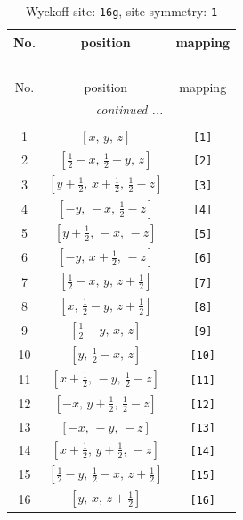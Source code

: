 \documentclass[fleqn,8pt]{jsarticle}
\begin{document}
\begin{longtable}{ccc}
\caption{Wyckoff site: {\tt 16g}, site symmetry: {\tt 1}}
 \\
 \hline \hline
No. & position & mapping \\ \hline \endfirsthead

\multicolumn{2}{l}{\tablename\ \thetable{}} \\
 \hline \hline
No. & position & mapping \\ \hline \endhead

 \hline \hline
\multicolumn{2}{r}{\footnotesize\it continued ...} \\ \endfoot

 \hline \hline
\multicolumn{2}{r}{} \\ \endlastfoot

1 & $\left[ x,\, y,\, z \right]$ & {\tt [1]} \\ \hline
2 & $\left[ \frac{1}{2} - x,\, \frac{1}{2} - y,\, z \right]$ & {\tt [2]} \\ \hline
3 & $\left[ y + \frac{1}{2},\, x + \frac{1}{2},\, \frac{1}{2} - z \right]$ & {\tt [3]} \\ \hline
4 & $\left[ - y,\, - x,\, \frac{1}{2} - z \right]$ & {\tt [4]} \\ \hline
5 & $\left[ y + \frac{1}{2},\, - x,\, - z \right]$ & {\tt [5]} \\ \hline
6 & $\left[ - y,\, x + \frac{1}{2},\, - z \right]$ & {\tt [6]} \\ \hline
7 & $\left[ \frac{1}{2} - x,\, y,\, z + \frac{1}{2} \right]$ & {\tt [7]} \\ \hline
8 & $\left[ x,\, \frac{1}{2} - y,\, z + \frac{1}{2} \right]$ & {\tt [8]} \\ \hline
9 & $\left[ \frac{1}{2} - y,\, x,\, z \right]$ & {\tt [9]} \\ \hline
10 & $\left[ y,\, \frac{1}{2} - x,\, z \right]$ & {\tt [10]} \\ \hline
11 & $\left[ x + \frac{1}{2},\, - y,\, \frac{1}{2} - z \right]$ & {\tt [11]} \\ \hline
12 & $\left[ - x,\, y + \frac{1}{2},\, \frac{1}{2} - z \right]$ & {\tt [12]} \\ \hline
13 & $\left[ - x,\, - y,\, - z \right]$ & {\tt [13]} \\ \hline
14 & $\left[ x + \frac{1}{2},\, y + \frac{1}{2},\, - z \right]$ & {\tt [14]} \\ \hline
15 & $\left[ \frac{1}{2} - y,\, \frac{1}{2} - x,\, z + \frac{1}{2} \right]$ & {\tt [15]} \\ \hline
16 & $\left[ y,\, x,\, z + \frac{1}{2} \right]$ & {\tt [16]} \\
\end{longtable}
\end{document}
